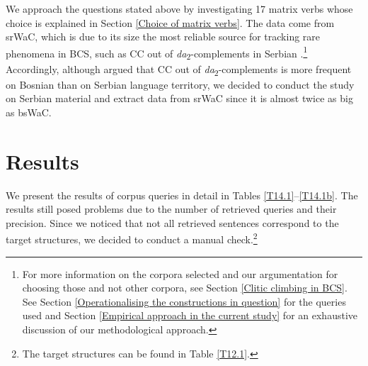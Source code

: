 \begin{sloppypar}We approach the questions stated above by investigating 17 matrix verbs whose choice is explained in Section \ref{Choice of matrix verbs}. The data come from srWaC, which is due to its size the most reliable source for tracking rare phenomena in BCS, such as CC out of \textit{da}\textsubscript{2}-complements in Serbian \citep*{JHK17a}.\footnote{For more information on the corpora selected and our argumentation for choosing those and not other corpora, see Section \ref{Clitic climbing in BCS}. See Section \ref{Operationalising the constructions in question} for the queries used and Section \ref{Empirical approach in the current study} for an exhaustive discussion of our methodological approach.} Accordingly, although \citet{Markovic55} argued that CC out of \textit{da}\textsubscript{2}-complements is more frequent on Bosnian than on Serbian language territory, we decided to conduct the study on Serbian material and extract data from srWaC since it is almost twice as big as bsWaC.\end{sloppypar}

\section{Results}
\label{Results:da}
We present the results of corpus queries in detail in Tables \ref{T14.1}--\ref{T14.1b}. The results still posed problems due to the number of retrieved queries and their precision. Since we noticed that not all retrieved sentences correspond to the target structures, we decided to conduct a manual check.\footnote{The target structures can be found in Table \ref{T12.1}.}  


